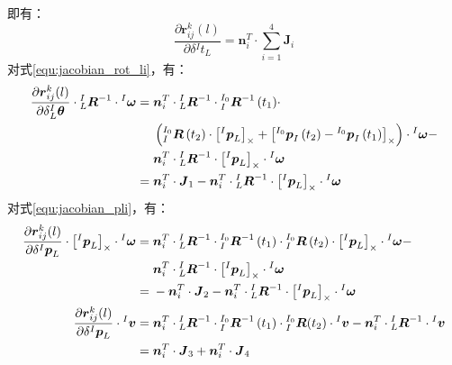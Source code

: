 即有：
\begin{equation}
  \frac{\partial \boldsymbol{r}_{ij}^k(l)}{\partial \delta {^{I}t_{L}}}=
  \boldsymbol{n}_i^T\cdot\sum_{i=1}^{4}\boldsymbol{J}_i
\end{equation}
对式\ref{equ:jacobian_rot_li}，有：
\begin{equation}
  \begin{aligned}
    \frac{\partial \boldsymbol{r}_{ij}^k(l)}{\partial \delta {^{I}_{L}\boldsymbol{\theta}}}
    \cdot{{^{I}_{L}}\boldsymbol{R}^{-1}}\cdot{^{I}\boldsymbol{\omega}} =\; &
    \boldsymbol{n}_i^T\cdot
    {{^{I}_{L}}\boldsymbol{R}^{-1}}\cdot{{^{I_0}_{I}}\boldsymbol{R}^{-1}
      \left( t_1\right) }\cdot
    \\\;&\left(
    {{^{I_0}_{I}}\boldsymbol{R}\left( t_2\right) }\cdot\left[ {^{I}\boldsymbol{p}_L} \right]_\times
    +\left[ {^{I_0}\boldsymbol{p}_I\left( t_2\right)}-{^{I_0}\boldsymbol{p}_I\left( t_1\right)} \right]_\times
    \right)
    \cdot{^{I}\boldsymbol{\omega}}-
    \\\;&
    \boldsymbol{n}_i^T\cdot
    {{^{I}_{L}}\boldsymbol{R}^{-1}}\cdot\left[ {^{I}\boldsymbol{p}_L} \right]_\times\cdot{^{I}\boldsymbol{\omega}}
    \\=\;&\boldsymbol{n}_i^T\cdot\boldsymbol{J}_1-
    \boldsymbol{n}_i^T\cdot
    {{^{I}_{L}}\boldsymbol{R}^{-1}}\cdot\left[ {^{I}\boldsymbol{p}_L} \right]_\times\cdot{^{I}\boldsymbol{\omega}}
  \end{aligned}
\end{equation}
对式\ref{equ:jacobian_pli}，有：
\begin{equation}
  \begin{aligned}
    \frac{\partial \boldsymbol{r}_{ij}^k(l)}{\partial \delta {^{I}\boldsymbol{p}_L}}
    \cdot\left[ {^{I}\boldsymbol{p}_L} \right]_\times\cdot{^{I}\boldsymbol{\omega}} =\; &
    \boldsymbol{n}_i^T\cdot
    {{^{I}_{L}}\boldsymbol{R}^{-1}}\cdot{{^{I_0}_{I}}\boldsymbol{R}^{-1}
      \left( t_1\right) }\cdot{{^{I_0}_{I}}\boldsymbol{R}\left( t_2\right) }
    \cdot\left[ {^{I}\boldsymbol{p}_L} \right]_\times
    \cdot{^{I}\boldsymbol{\omega}}-
    \\\;&\boldsymbol{n}_i^T\cdot
    {{^{I}_{L}}\boldsymbol{R}^{-1}}\cdot\left[ {^{I}\boldsymbol{p}_L} \right]_\times\cdot{^{I}\boldsymbol{\omega}}
    \\=\;&-\boldsymbol{n}_i^T\cdot\boldsymbol{J}_2-
    \boldsymbol{n}_i^T\cdot
    {{^{I}_{L}}\boldsymbol{R}^{-1}}\cdot\left[ {^{I}\boldsymbol{p}_L} \right]_\times\cdot{^{I}\boldsymbol{\omega}}
    \\
    \frac{\partial \boldsymbol{r}_{ij}^k(l)}{\partial \delta {^{I}\boldsymbol{p}_L}}
    \cdot{^{I}\boldsymbol{v}}           =\;                                &
    \boldsymbol{n}_i^T\cdot{{^{I}_{L}}\boldsymbol{R}^{-1}}
    \cdot{{^{I_0}_{I}}\boldsymbol{R}^{-1}\left( t_1\right) }
    \cdot{^{I_0}_{I}\boldsymbol{R}}(t_2)\cdot{^{I}\boldsymbol{v}}
    -\boldsymbol{n}_i^T\cdot{{^{I}_{L}}\boldsymbol{R}^{-1}}\cdot{^{I}\boldsymbol{v}} \\=\;&
    \boldsymbol{n}_i^T\cdot\boldsymbol{J}_3+\boldsymbol{n}_i^T\cdot\boldsymbol{J}_4
  \end{aligned}
\end{equation}
